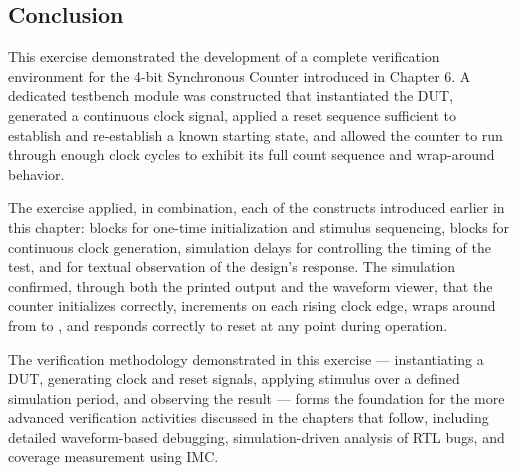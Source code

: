 \subsection{Conclusion}

This exercise demonstrated the development of a complete verification environment for the 4-bit Synchronous Counter introduced in Chapter 6. A dedicated testbench module was constructed that instantiated the DUT, generated a continuous clock signal, applied a reset sequence sufficient to establish and re-establish a known starting state, and allowed the counter to run through enough clock cycles to exhibit its full count sequence and wrap-around behavior.

The exercise applied, in combination, each of the constructs introduced earlier in this chapter:  blocks for one-time initialization and stimulus sequencing,  blocks for continuous clock generation, simulation delays for controlling the timing of the test, and  for textual observation of the design's response. The simulation confirmed, through both the printed output and the waveform viewer, that the counter initializes correctly, increments on each rising clock edge, wraps around from  to , and responds correctly to reset at any point during operation.

The verification methodology demonstrated in this exercise --- instantiating a DUT, generating clock and reset signals, applying stimulus over a defined simulation period, and observing the result --- forms the foundation for the more advanced verification activities discussed in the chapters that follow, including detailed waveform-based debugging, simulation-driven analysis of RTL bugs, and coverage measurement using IMC.
